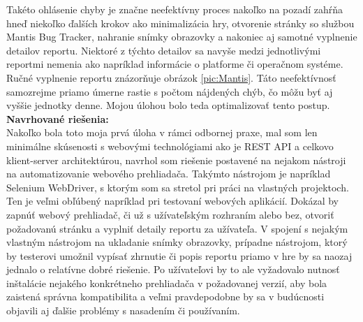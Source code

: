 \documentclass[slovak, bachelorpractice]{diploma}
\begin{document}
Takéto ohlásenie chyby je značne neefektívny proces nakoľko na pozadí zahŕňa hneď niekoľko ďalších krokov ako minimalizácia hry, otvorenie stránky so službou Mantis Bug Tracker, nahranie snímky obrazovky a nakoniec aj samotné vyplnenie detailov reportu. Niektoré z týchto detailov sa navyše medzi jednotlivými reportmi nemenia ako napríklad informácie o platforme či operačnom systéme. Ručné vyplnenie reportu znázorňuje obrázok \ref{pic:Mantis}.
Táto neefektívnosť samozrejme priamo úmerne rastie s počtom nájdených chýb, čo môžu byť aj vyššie jednotky denne. Mojou úlohou bolo teda optimalizovať tento postup. \\
\textbf{Navrhované riešenia:} \\ Nakoľko bola toto moja prvá úloha v rámci odbornej praxe, mal som len minimálne skúsenosti s webovými technológiami ako je REST API a celkovo klient-server architektúrou, navrhol som riešenie postavené na nejakom nástroji na automatizovanie webového prehliadača. Takýmto nástrojom je napríklad Selenium WebDriver, s ktorým som sa stretol pri práci na vlastných projektoch. Ten je veľmi obľúbený napríklad pri testovaní webových aplikácií. Dokázal by zapnúť webový prehliadač, či už s užívateľským rozhraním alebo bez, otvoriť požadovanú stránku a vyplniť detaily reportu za užívateľa. V spojení s nejakým vlastným nástrojom na ukladanie snímky obrazovky, prípadne nástrojom, ktorý by testerovi umožnil vypísať zhrnutie či popis reportu priamo v hre by sa naozaj jednalo o relatívne dobré riešenie. Po užívateľovi by to ale vyžadovalo nutnosť inštalácie nejakého konkrétneho prehliadača v požadovanej verzií, aby bola zaistená správna kompatibilita a veľmi pravdepodobne by sa v budúcnosti objavili aj ďalšie problémy s nasadením či používaním. 
\end{document}
